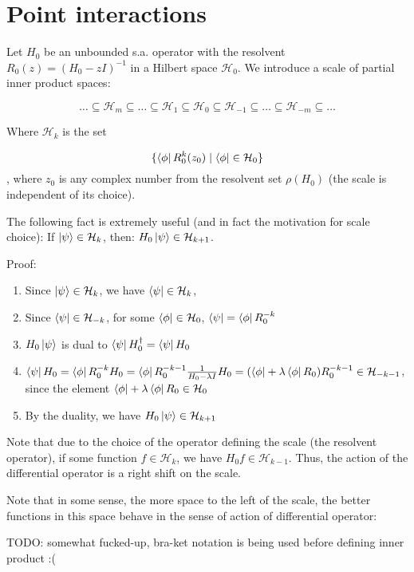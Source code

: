 \documentclass[12pt, a4paper]{article}
\newcommand{\hilb}[1]{\mathcal{H}_{#1}}
\begin{document}
\section{Point interactions}
Let $H_0$ be an unbounded s.a. operator with the resolvent $R_0(z) = (H_0 - z I)^{-1}$ in a Hilbert space $\hilb{0}$. We introduce a scale of partial inner product spaces:

\[ \dots \subseteq \hilb{m} \subseteq \dots \subseteq \hilb{1} \subseteq \hilb{0} \subseteq \hilb{-1} \subseteq \dots \subseteq \hilb{-m} \subseteq \dots \]

Where $\hilb{k}$ is the set

\[
\{\bra{\phi} R_0^k(z_0) \mid \bra{\phi} \in \hilb{0}\}
\]
, where $z_0$ is any complex number from the resolvent set $\rho(H_0)$ (the scale is independent of its choice).

The following fact is extremely useful (and in fact the motivation for scale choice): If $\ket{\psi} \in \hilb{k}$, then: $H_0 \ket{\psi} \in \hilb{k + 1}$.

Proof:

\begin{enumerate}
\item Since $\ket{\psi} \in \hilb{k}$, we have $\bra{\psi} \in \hilb{k}$,
\item Since $\bra{\psi} \in \hilb{-k}$, for some $\bra{\phi} \in \hilb{0}$, $\bra{\psi} = \bra{\phi} R_0^{-k}$
\item $H_0 \ket{\psi}$ is dual to $\bra{\psi} H_0^{\dagger} = \bra{\psi} H_0$
\item $\bra{\psi} H_0 = \bra{\phi} R_0^{-k} H_0 = \bra{\phi} R_0^{-k - 1} \frac{1}{H_0 - \lambda I} H_0 = (\bra{\phi} + \lambda \bra{\phi} R_0) R_0^{-k - 1}\in \hilb{-k - 1}$, since the element $\bra{\phi} + \lambda \bra{\phi} R_0 \in \hilb{0}$
\item By the duality, we have $H_0 \ket\psi \in \hilb{k + 1}$
\end{enumerate}



Note that due to the choice of the operator defining the scale (the resolvent operator), if some function $f \in \hilb{k}$, we have $H_0 f \in \hilb{k - 1}$. Thus, the action of the differential operator is a right shift on the scale.

Note that in some sense, the more space to the left of the scale, the better functions in this space behave in the sense of action of differential operator:


TODO: somewhat fucked-up, bra-ket notation is being used before defining inner product :(
\end{document}
